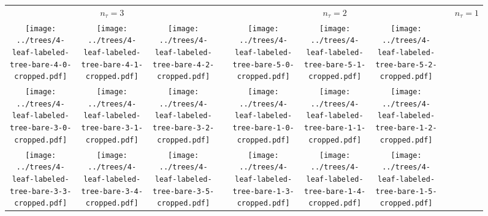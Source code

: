 \documentclass[border=10pt,varwidth=30cm]{standalone}
\newcommand{\ndivs}{\ensuremath{n_{\tau}}\xspace}
\newcommand{\pltwidth}{0.1}
\newcommand{\catspace}{0.02}
\begin{document}
\begin{figure}
    \setlength\arrayrulewidth{2pt}
    \centering
    \begin{tabular}{@{}ccccccccc@{}}
        \multicolumn{3}{c}{\LARGE $\ndivs = 3$} & & \multicolumn{3}{c}{\LARGE $\ndivs = 2$} & & {\LARGE $\ndivs = 1$} \\[1ex]
        \texttt{[image: ../trees/4-leaf-labeled-tree-bare-4-0-cropped.pdf]}
        &
        \texttt{[image: ../trees/4-leaf-labeled-tree-bare-4-1-cropped.pdf]}
        &
        \texttt{[image: ../trees/4-leaf-labeled-tree-bare-4-2-cropped.pdf]}
        &
        \hspace{\catspace\textwidth}
        &
        \texttt{[image: ../trees/4-leaf-labeled-tree-bare-5-0-cropped.pdf]}
        &
        \texttt{[image: ../trees/4-leaf-labeled-tree-bare-5-1-cropped.pdf]}
        &
        \texttt{[image: ../trees/4-leaf-labeled-tree-bare-5-2-cropped.pdf]}
        &
        \hspace{\catspace\textwidth}
        &
        \\
        \texttt{[image: ../trees/4-leaf-labeled-tree-bare-3-0-cropped.pdf]}
        &
        \texttt{[image: ../trees/4-leaf-labeled-tree-bare-3-1-cropped.pdf]}
        &
        \texttt{[image: ../trees/4-leaf-labeled-tree-bare-3-2-cropped.pdf]}
        &
        &
        \texttt{[image: ../trees/4-leaf-labeled-tree-bare-1-0-cropped.pdf]}
        &
        \texttt{[image: ../trees/4-leaf-labeled-tree-bare-1-1-cropped.pdf]}
        &
        \texttt{[image: ../trees/4-leaf-labeled-tree-bare-1-2-cropped.pdf]}
        &
        &
        \\
        \texttt{[image: ../trees/4-leaf-labeled-tree-bare-3-3-cropped.pdf]}
        &
        \texttt{[image: ../trees/4-leaf-labeled-tree-bare-3-4-cropped.pdf]}
        &
        \texttt{[image: ../trees/4-leaf-labeled-tree-bare-3-5-cropped.pdf]}
        &
        &
        \texttt{[image: ../trees/4-leaf-labeled-tree-bare-1-3-cropped.pdf]}
        &
        \texttt{[image: ../trees/4-leaf-labeled-tree-bare-1-4-cropped.pdf]}
        &
        \texttt{[image: ../trees/4-leaf-labeled-tree-bare-1-5-cropped.pdf]}

\end{tabular}
\end{figure}
\end{document}
